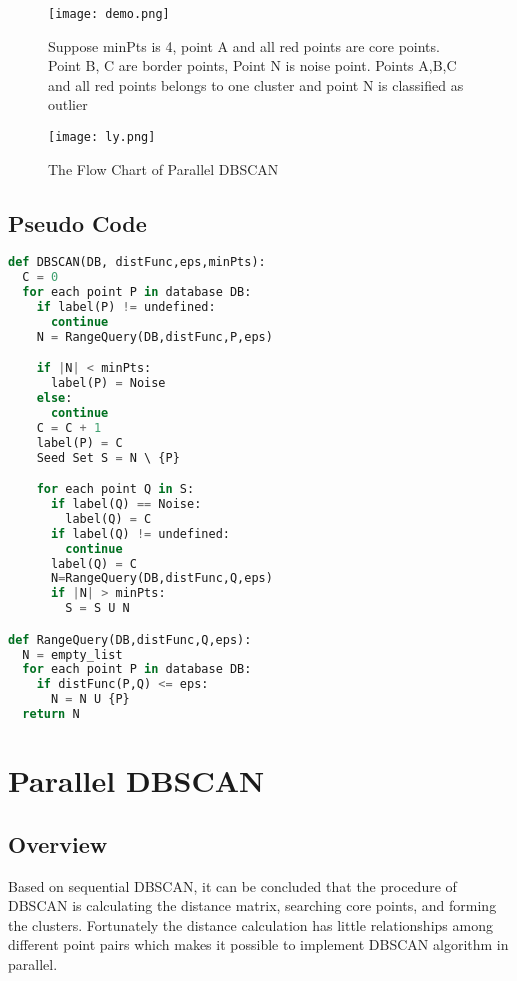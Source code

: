 \documentclass[letterpaper,twocolumn,10pt]{article}
\begin{document}
\begin{figure}[h]
\centering
\texttt{[image: demo.png]}
\caption{Suppose minPts is 4, point A and all red points are core points. Point B, C are border points, Point N is noise point. Points A,B,C and all red points belongs to one cluster and point N is classified as outlier}
\label{fig:label}
\end{figure}
\begin{figure*}[thp]
\centering
\texttt{[image: ly.png]}
\caption{The Flow Chart of Parallel DBSCAN}
\label{fig:label}
\end{figure*}
\subsection{Pseudo Code}
\begin{lstlisting}[language = Python]
def DBSCAN(DB, distFunc,eps,minPts):
  C = 0
  for each point P in database DB:
    if label(P) != undefined:
      continue
    N = RangeQuery(DB,distFunc,P,eps)

    if |N| < minPts:
      label(P) = Noise
    else:
      continue
    C = C + 1
    label(P) = C
    Seed Set S = N \ {P}

    for each point Q in S:
      if label(Q) == Noise:
        label(Q) = C
      if label(Q) != undefined:
        continue
      label(Q) = C
      N=RangeQuery(DB,distFunc,Q,eps)
      if |N| > minPts:
        S = S U N

def RangeQuery(DB,distFunc,Q,eps):
  N = empty_list
  for each point P in database DB:
    if distFunc(P,Q) <= eps:
      N = N U {P}
  return N

\end{lstlisting}

\section{Parallel DBSCAN}
\subsection{Overview}

\quad Based on sequential DBSCAN, it can be concluded that the procedure of DBSCAN is calculating the distance matrix, searching core points, and forming the clusters. Fortunately the distance calculation has little relationships among different point pairs which makes it possible to implement DBSCAN algorithm in parallel.
\end{document}
